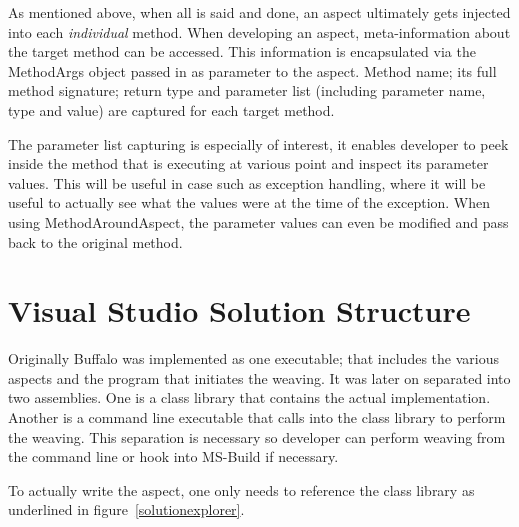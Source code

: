 As mentioned above, when all is said and done, an aspect ultimately gets injected into each \textit{individual} method. When developing an aspect, meta-information about the target method can be accessed. This information is encapsulated via the MethodArgs object passed in as parameter to the aspect. Method name; its full method signature; return type and parameter list (including parameter name, type and value) are captured for each target method.

The parameter list capturing is especially of interest, it enables developer to peek inside the method that is executing at various point and inspect its parameter values. This will be useful in case such as exception handling, where it will be useful to actually see what the values were at the time of the exception. When using MethodAroundAspect, the parameter values can even be modified and pass back to the original method.

\section{Visual Studio Solution Structure}

Originally Buffalo was implemented as one executable; that includes the various aspects and the program that initiates the weaving. It was later on separated into two assemblies. One is a class library that contains the actual implementation. Another is a command line executable that calls into the class library to perform the weaving. This separation is necessary so developer can perform weaving from the command line or hook into MS-Build if necessary. 

To actually write the aspect, one only needs to reference the class library as underlined in figure~\ref{solutionexplorer}.

